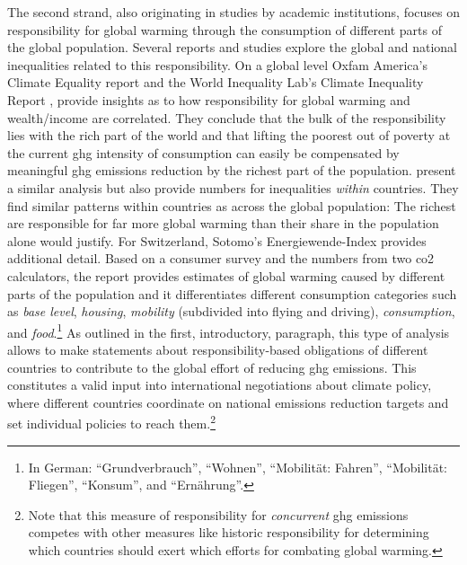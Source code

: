 \documentclass[a4paper,11pt,abstract=true]{scrartcl}
\begin{document}
The second strand, also originating in studies by academic institutions, focuses on responsibility for global warming through the consumption of different parts of the global population.
Several reports and studies explore the global and national inequalities related to this responsibility.
On a global level Oxfam America's Climate Equality report \citep{khalfan_climate_2023} and the World Inequality Lab's Climate Inequality Report \citep{chancel_climate_2023}, provide insights as to how responsibility for global warming and wealth/income are correlated.
They conclude that the bulk of the responsibility lies with the rich part of the world and that lifting the poorest out of poverty at the current \ac{ghg} intensity of consumption can easily be compensated by meaningful \ac{ghg} emissions reduction by the richest part of the population.
\citet{chancel_climate_2023} present a similar analysis but also provide numbers for inequalities \emph{within} countries.
They find similar patterns within countries as across the global population:
The richest are responsible for far more global warming than their share in the population alone would justify.
For Switzerland, Sotomo's Energiewende-Index \citep{stuckelberger_helion_2024} provides additional detail.
Based on a consumer survey and the numbers from two \acs{co2} calculators, the report provides estimates of global warming caused by different parts of the population and it differentiates different consumption categories such as \emph{base level}, \emph{housing}, \emph{mobility} (subdivided into flying and driving), \emph{consumption}, and \emph{food}.\footnote{%
  In German:
``Grundverbrauch'', ``Wohnen'', ``Mobilität: Fahren'', ``Mobilität: Fliegen'', ``Konsum'', and ``Ernährung''.}
As outlined in the first, introductory, paragraph, this type of analysis allows to make statements about responsibility-based obligations of different countries to contribute to the global effort of reducing \ac{ghg} emissions.
This constitutes a valid input into international negotiations about climate policy, where different countries coordinate on national emissions reduction targets and set individual policies to reach them.\footnote{%
Note that this measure of responsibility for \emph{concurrent} \ac{ghg} emissions competes with other measures like historic responsibility for determining which countries should exert which efforts for combating global warming.
}
\end{document}
